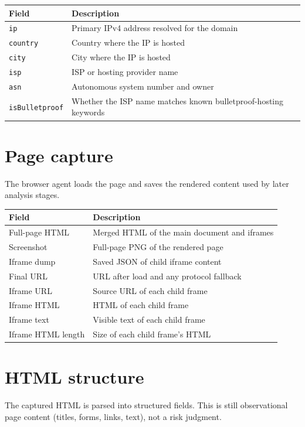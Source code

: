\documentclass[11pt,a4paper]{article}
\begin{document}
\begin{tabular}{@{}p{3.2cm}p{10cm}@{}}
  \toprule
  \textbf{Field} & \textbf{Description} \\
  \midrule
  \texttt{ip} & Primary IPv4 address resolved for the domain \\
  \texttt{country} & Country where the IP is hosted \\
  \texttt{city} & City where the IP is hosted \\
  \texttt{isp} & ISP or hosting provider name \\
  \texttt{asn} & Autonomous system number and owner \\
  \texttt{isBulletproof} & Whether the ISP name matches known bulletproof-hosting keywords \\
  \bottomrule
\end{tabular}

\section{Page capture}

The browser agent loads the page and saves the rendered content used by later analysis stages.

\begin{tabular}{@{}p{3.8cm}p{9.4cm}@{}}
  \toprule
  \textbf{Field} & \textbf{Description} \\
  \midrule
  Full-page HTML & Merged HTML of the main document and iframes \\
  Screenshot & Full-page PNG of the rendered page \\
  Iframe dump & Saved JSON of child iframe content \\
  Final URL & URL after load and any protocol fallback \\
  Iframe URL & Source URL of each child frame \\
  Iframe HTML & HTML of each child frame \\
  Iframe text & Visible text of each child frame \\
  Iframe HTML length & Size of each child frame's HTML \\
  \bottomrule
\end{tabular}

\section{HTML structure}

The captured HTML is parsed into structured fields. This is still observational page content (titles, forms, links, text), not a risk judgment.
\end{document}

